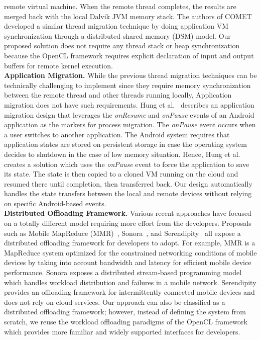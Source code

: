 \documentclass[10pt, conference, compsocconf]{IEEEtran}
\begin{document}
remote virtual machine.
%
When the remote thread completes, the results are merged back with the
local Dalvik JVM memory stack.
%
The authors of COMET~\cite{comet} developed a similar thread migration
technique by doing application VM synchronization through a distributed
shared memory (DSM) model.
%
Our proposed solution does not require any thread stack or heap
synchronization because the OpenCL framework requires explicit
declaration of input and output buffers for remote kernel execution.\\
%
\indent\textbf{Application Migration.} While the previous thread migration techniques
can be technically challenging to implement since they require memory
synchronization between the remote thread and other threads running
locally, Application migration does not have such requirements.
%
%
%
Hung et al.~\cite{hung} describes an application migration design that
leverages the \textit{onResume} and \textit{onPause} events of an
Android application as the markers for process migration.
%
The \textit{onPause} event occurs when a user switches to another
application.
%
The Android system requires that application states are stored on
persistent storage in case the operating system decides to shutdown in
the case of low memory situation.
%
Hence, Hung et al. creates a solution which uses the \textit{onPause}
event to force the application to save its state.
%
The state is then copied to a cloned VM running on the cloud and resumed
there until completion, then transferred back.
%
Our design automatically handles the state transfers between the local
and remote devices without relying on specific Android-based events.\\
%
\indent\textbf{Distributed Offloading Framework.} Various recent approaches
have focused on a totally different model requiring more effort from the
developers.
%
Proposals such as Mobile MapReduce (MMR)~\cite{mmr},
Sonora~\cite{sonora}, and Serendipity~\cite{serendipity} all expose a
distributed offloading framework for developers to adopt.
%
For example, MMR is a MapReduce system optimized for the constrained
networking conditions of mobile devices by taking into account bandwidth
and latency for efficient mobile device performance.
%
Sonora exposes a distributed stream-based programming model which
handles workload distribution and failures in a mobile network.
%
Serendipity provides an offloading framework for intermittently
connected mobile devices and does not rely on cloud services.
%
Our approach can also be classified as a distributed offloading
framework; however, instead of defining the system from scratch, we
reuse the workload offloading paradigms of the OpenCL
framework which provides more familiar and widely supported interfaces
for developers. 
%
\end{document}
